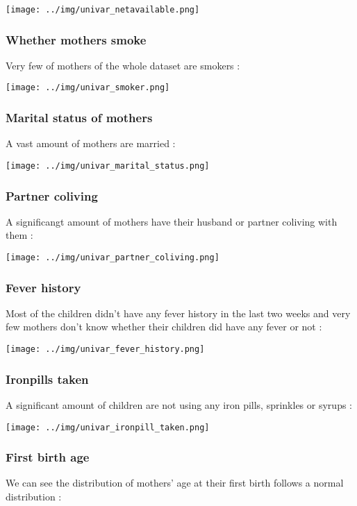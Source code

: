 \texttt{[image: ../img/univar\_netavailable.png]}


\subsubsection{Whether mothers smoke}

Very few of mothers of the whole dataset are smokers :

\texttt{[image: ../img/univar\_smoker.png]}

\subsubsection{Marital status of mothers}
A vast amount of mothers are married :

\texttt{[image: ../img/univar\_marital\_status.png]}


\subsubsection{Partner coliving}
A significangt amount of mothers have their husband or partner coliving with them :

\texttt{[image: ../img/univar\_partner\_coliving.png]}

\subsubsection{Fever history}
Most of the children didn't have any fever history in the last two weeks and very few mothers don't know whether their children did have any fever or not :

\texttt{[image: ../img/univar\_fever\_history.png]}


\subsubsection{Ironpills taken}
A significant amount of children are not using any iron pills, sprinkles or syrups :

\texttt{[image: ../img/univar\_ironpill\_taken.png]}


\subsubsection{First birth age}

We can see the distribution of mothers' age at their first birth follows a normal distribution :

